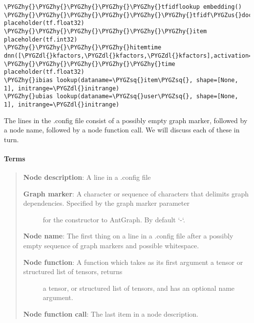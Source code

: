\documentclass[letterpaper,10pt,english]{sphinxmanual}
\def\PYGZus{\char`\_}
\def\PYGZdl{\char`\$}
\def\PYGZhy{\char`\-}
\def\PYGZsq{\char`\'}
\renewcommand\PYGZsq{\textquotesingle}
\begin{document}
\begin{Verbatim}[commandchars=\\\{\}]
\PYGZhy{}\PYGZhy{}\PYGZhy{}\PYGZhy{}\PYGZhy{}tfidflookup embedding()
\PYGZhy{}\PYGZhy{}\PYGZhy{}\PYGZhy{}\PYGZhy{}\PYGZhy{}tfidf\PYGZus{}doc\PYGZus{}term placeholder(tf.float32)
\PYGZhy{}\PYGZhy{}\PYGZhy{}\PYGZhy{}\PYGZhy{}\PYGZhy{}item placeholder(tf.int32)
\PYGZhy{}\PYGZhy{}\PYGZhy{}\PYGZhy{}hitemtime dnn([\PYGZdl{}kfactors,\PYGZdl{}kfactors,\PYGZdl{}kfactors],activation=\PYGZsq{}tanh\PYGZsq{},bn=True,keep\PYGZus{}prob=None)
\PYGZhy{}\PYGZhy{}\PYGZhy{}\PYGZhy{}\PYGZhy{}time placeholder(tf.float32)
\PYGZhy{}ibias lookup(dataname=\PYGZsq{}item\PYGZsq{}, shape=[None, 1], initrange=\PYGZdl{}initrange)
\PYGZhy{}ubias lookup(dataname=\PYGZsq{}user\PYGZsq{}, shape=[None, 1], initrange=\PYGZdl{}initrange)
\end{Verbatim}

The lines in the .config file consist of a possibly empty graph marker, followed by a node name, followed by a node function call.
We will discuss each of these in turn.


\paragraph{Terms}
\label{config_tutorial:terms}\begin{quote}

\textbf{Node description}: A line in a .config file
\begin{description}
\item[{\textbf{Graph marker}: A character or sequence of characters that delimits graph dependencies. Specified by the graph marker parameter}] \leavevmode
for the constructor to AntGraph. By default `-`.

\end{description}

\textbf{Node name}: The first thing on a line in a .config file after a possibly empty sequence of graph markers and possible whitespace.
\begin{description}
\item[{\textbf{Node function}: A function which takes as its first argument a tensor or structured list of tensors, returns}] \leavevmode
a tensor, or structured list of tensors, and has an optional name argument.

\end{description}

\textbf{Node function call}: The last item in a node description.
\end{quote}
\end{document}
